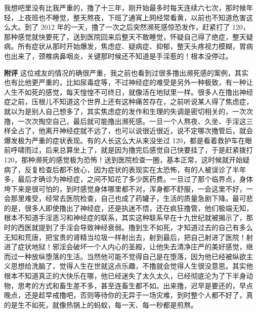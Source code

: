 \begin{case}
    我想吧里没有比我严重的，撸了十三年，刚开始最多时每天连续六七次，那时候年轻，上夜班也不睡觉，整天熬夜，下班了通宵上网经常看黄，以前也不知道危害这么大。到了 2012 年的一天，撸了一次之后突然濒死感惊恐发作，赶紧打了 120，那种感觉就快要死了，送到医院回来后整天不敢睡觉，怀疑自己得了绝症，整天疑病。所有症状从那时开始爆发，焦虑症、疑病症、抑郁，整天头疼视力模糊，胃病也出来了，颈椎病鼻咽炎，关键那时候还不知道是手淫惹的！根本没停过。

    \textbf{附评} 这位戒友的情况的确很严重，我之前也看到过很多撸出濒死感的案例，其实也有比他更严重的，比如尿毒症等，不过神经症的难受是另外一种极致，有一种让人生不如死的感觉，每天惶惶不可终日，就像活在地狱里一样。很多人在撸出神经症之前，压根儿不知道这个世界上还有这种痛苦存在，之前听说某人得了焦虑症，就以为是别人自己想多了，其实焦虑症的发作和生理的失调是密切相关的，一次次撸，一次次掏空自己，最后就可能撸出濒死感。一旦一个人熬夜、久坐、手淫这三样全占了，他离开神经症就不远了，也可以说很近很近，说不定哪次撸管后，就会爆发极为严重的症状表现。有的人长这么大从来没坐过 120，都是看着救护车在眼前呼啸而过，后来总算坐上了，就是因为撸完后感觉自己快要挂了，于是赶紧拨打 120，那种濒死的感觉极为恐怖！送到医院检查一圈，基本正常，这时候就开始疑病了，反复检查后都不放心，因为症状的表现实在太恐怖，有的人被误诊了半年多，最后才确诊为神经症，之间不知花了多少医药费。一旦过了那个临界点，身体垮下来是很可怕的，到时感觉身体哪里都不对，浑身都不舒服，一会这里不好，一会那里难受，经常去医院检查，自己也成了药罐子，生活的质量急剧下降。最可悲的是，很多人即使撸出了神经症，还是执迷不悟，还在疯狂撸管，他们极端无知，根本不知道手淫恶习和神经症的联系，其实这种联系早在十九世纪就被揭示了，那时的西医就提到了手淫会导致神经衰弱。撸到生不如死，才知道过去的自己有多么无知和荒唐，把宝贵的肾精当垃圾一样射出去，射到最后，把自己射进了医院！射进了症状地狱！邪淫会破坏一个人内心的圣殿，让他失去清净庄严的美好感觉，继而过一种放纵堕落的生活。当然他可能不觉得自己是在堕落，因为他已经被纵欲主义思想给洗脑了，觉得人生在世就这点乐趣，不撸就会觉得人生很没意思。其实他根本不知道真正的大快乐在哪，他已经迷失了太久太久，已经彻底沦为了下半身动物，思考的方式和畜生差不多，甚至连畜生都不如。出来撸，迟早是要还的，早点晚点，还是趁早戒撸吧，否则等待你的无异于一场灾难，到时整个人都不好了，真的是生不如死，就像热锅上的蚂蚁，每一天、每一秒都是煎熬。
\end{case}

